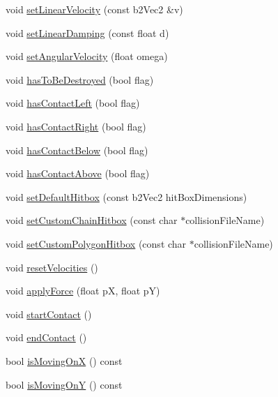 \begin{DoxyCompactItemize}
\item 
void \hyperlink{class_symp_1_1_physical_entity_ab5479830ff808bc01e378e1f7ada6995}{set\-Linear\-Velocity} (const b2\-Vec2 \&v)
\item 
void \hyperlink{class_symp_1_1_physical_entity_af6c10adba8855a4431ae52eff1815d1c}{set\-Linear\-Damping} (const float d)
\item 
void \hyperlink{class_symp_1_1_physical_entity_a70efc8300684bdec27a68efeca671813}{set\-Angular\-Velocity} (float omega)
\item 
void \hyperlink{class_symp_1_1_physical_entity_a5e5e26a8b797b32a9024b244a0d9ccec}{has\-To\-Be\-Destroyed} (bool flag)
\item 
void \hyperlink{class_symp_1_1_physical_entity_a8fa95e4e4bbf5eb0f63275c6b84e0a67}{has\-Contact\-Left} (bool flag)
\item 
void \hyperlink{class_symp_1_1_physical_entity_acc585f9d58b304a4c8022f43cb61a3ad}{has\-Contact\-Right} (bool flag)
\item 
void \hyperlink{class_symp_1_1_physical_entity_a5cd96fd3c05d8a4b08ba7fb8464933e9}{has\-Contact\-Below} (bool flag)
\item 
void \hyperlink{class_symp_1_1_physical_entity_a4ce81bc04ce3ff1aa255f7e86cb16bd2}{has\-Contact\-Above} (bool flag)
\item 
void \hyperlink{class_symp_1_1_physical_entity_a86777e54215c6e3aa31a9367b8426aeb}{set\-Default\-Hitbox} (const b2\-Vec2 hit\-Box\-Dimensions)
\item 
void \hyperlink{class_symp_1_1_physical_entity_a2d5a2029383007355a824bd7da0e0516}{set\-Custom\-Chain\-Hitbox} (const char $\ast$collision\-File\-Name)
\item 
void \hyperlink{class_symp_1_1_physical_entity_afd9184ffa8b31d0532ffc71535ae7507}{set\-Custom\-Polygon\-Hitbox} (const char $\ast$collision\-File\-Name)
\item 
void \hyperlink{class_symp_1_1_physical_entity_a583c1e93d53902b422bf8a31867d59ce}{reset\-Velocities} ()
\item 
void \hyperlink{class_symp_1_1_physical_entity_a8ee421b42c7787df009f00751956f8bd}{apply\-Force} (float p\-X, float p\-Y)
\item 
void \hyperlink{class_symp_1_1_physical_entity_a3d1667d75e4af926d5d2c7a6811cc14b}{start\-Contact} ()
\item 
void \hyperlink{class_symp_1_1_physical_entity_a7e335e9eb8636bc912494540a34b6fba}{end\-Contact} ()
\item 
bool \hyperlink{class_symp_1_1_physical_entity_a7517058d256eb78ed0275d4954ef0d52}{is\-Moving\-On\-X} () const 
\item 
bool \hyperlink{class_symp_1_1_physical_entity_a94af74b91cda96a47cd312aea640d25f}{is\-Moving\-On\-Y} () const 
\end{DoxyCompactItemize}
